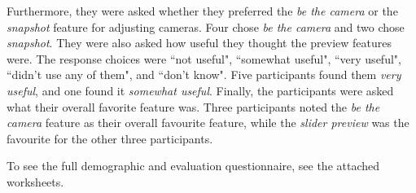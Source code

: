 Furthermore, they were asked whether they preferred the \textit{be the camera} or the \textit{snapshot} feature for adjusting cameras. Four chose \textit{ be the camera} and two chose \textit{snapshot}. 
They were also asked how useful they thought the preview features were. The response choices were ``not useful", ``somewhat useful", ``very useful", ``didn't use any of them", and ``don't know". Five participants found them \textit{very useful}, and one found it \textit{somewhat useful}.
Finally, the participants were asked what their overall favorite feature was. Three participants noted the \textit{be the camera} feature as their overall favourite feature, while the \textit{slider preview} was the favourite for the other three participants. 

To see the full demographic and evaluation questionnaire, see the attached worksheets.



